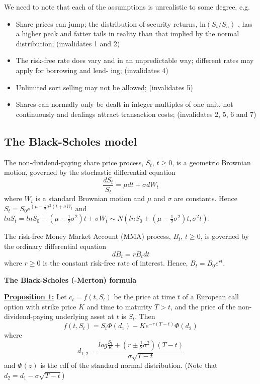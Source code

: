 \documentclass[11pt,a4paper]{book}
\theoremstyle{definition}\newtheorem{definition}{Definition}
\theoremstyle{definition}\newtheorem{fact}{Fact}
\theoremstyle{definition}\newtheorem{remark}{Remark}
\theoremstyle{definition}\newtheorem{ex}{Ex.}
\theoremstyle{definition}\newtheorem{project}{Project}
\theoremstyle{definition}\newtheorem{problem}{Problem}
\theoremstyle{definition}\newtheorem{example}{Example}
\numberwithin{theorem}{section}
\numberwithin{corollary}{chapter}
\numberwithin{assumption}{chapter}
\numberwithin{definition}{chapter}
\numberwithin{prop}{chapter}
\numberwithin{notation}{chapter}
\numberwithin{problem}{chapter}
\numberwithin{example}{chapter}
\numberwithin{fact}{chapter}
\numberwithin{ex}{chapter}
\begin{document}
We need to note that each of the assumptions is unrealistic to some degree, e.g.
\begin{itemize}
\item Share prices can jump; the distribution of security returns, ln$(S_t/S_u)$ , has a higher peak and fatter tails in reality than that implied by the normal distribution; (invalidates 1 and 2)
\item The risk-free rate does vary and in an unpredictable way; different rates may apply for borrowing and lend- ing; (invalidates 4)
\item Unlimited sort selling may not be allowed; (invalidates 5)
\item Shares can normally only be dealt in integer multiples of one unit, not continuously and dealings attract transaction costs; (invalidates 2, 5, 6 and 7)
\end{itemize}

\subsection{The Black-Scholes model}
The non-dividend-paying share price process, $S_t$, $t \geq 0$, is a geometric Brownian motion, governed by the stochastic differential equation
\begin{equation}
\frac{dS_t}{S_t} = \mu dt + \sigma dW_t
\end{equation}
where $W_t$ is a standard Brownian motion and $\mu$ and $\sigma$ are constants. Hence $S_t = S_0 e^{(\mu-\frac{1}{2}\sigma^2)t + \sigma W_t}$ and $lnS_t = lnS_0 + (\mu - \frac{1}{2}\sigma^2)t + \sigma W_t \sim N(lnS_0 + (\mu - \frac{1}{2}\sigma^2)t, \sigma^2 t)$.

The risk-free Money Market Account (MMA) process, $B_t$, $t \geq 0$, is governed by the ordinary differential equation
\begin{equation}
dB_t = r B_t dt
\end{equation}
where $r \geq 0$ is the constant risk-free rate of interest. Hence, $B_t = B_0 e^{rt}$.

\textbf{The Black-Scholes (-Merton) formula}

\textbf{\underline{Proposition 1:}} Let $c_t = f(t, S_t)$ be the price at time $t$ of a European call option with strike price $K$ and time to maturity $T>t$, and the price of the non-dividend-paying underlying asset at $t$ is $S_t$. Then
\begin{equation}
f(t,S_t) = S_t \Phi(d_1) - Ke^{-r(T-t)}\Phi(d_2)
\end{equation}
where
\begin{equation}
d_{1,2} = \frac{log\frac{S_t}{K}+(r \pm \frac{1}{2}\sigma^2)(T-t)}{\sigma \sqrt{T-t}}
\end{equation}
and $\Phi(z)$ is the cdf of the standard normal distribution. (Note that $d_2 = d_1 - \sigma \sqrt{T-t}$)
\end{document}
